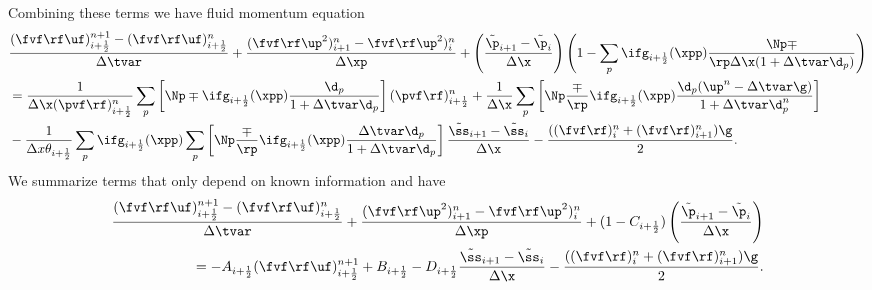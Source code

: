 \color{black}
Combining these terms we have fluid momentum equation
\begin{equation}
\begin{aligned}
\label{eq:momentumEquationFluidDisc}
    &\dfrac{(\fvf \rf \uf)_{i+\frac{1}{2}}^{n+1}- (\fvf \rf \uf)_{i+\frac{1}{2}}^{n}}{\Delta \tvar} + \dfrac{(\fvf \rf \up^2)^n_{i+1}-\fvf \rf \up^2)^n_{i}}{\Delta \xp}
    +  \left( \dfrac{\tilde{\p}_{i+1} - \tilde{\p}_i}{\Delta \x} \right) 
    \left( 1 - \sum_p \ifg_{i+\frac{1}{2}} (\xpp) \dfrac{\Np \mp}{\rp \Delta \x (1 + \Delta \tvar \d_p)} \right) \\
    &=
    \dfrac{1}{\Delta \x (\pvf \rf)_{i+\frac{1}{2}}^n} \sum_p \left[ \Np \mp \ifg_{i+\frac{1}{2}} (\xpp) \frac{\d_p}{1+ \Delta \tvar \d_p}\right] (\pvf \rf)_{i+\frac{1}{2}}^n
    + \dfrac{1}{\Delta \x} \sum_p \left[ \Np \dfrac{\mp}{\rp} \ifg_{i+\frac{1}{2}} (\xpp) \dfrac{\d_p (\up^n - \Delta \tvar \g)}{1 + \Delta \tvar \d_p^n}\right] \\
    &- \dfrac{1}{\Delta x \theta_{i+\frac{1}{2}}} \sum_{p} \ifg_{i+\frac{1}{2}} (\xpp) \sum_p \left[ \Np \dfrac{\mp}{\rp} \ifg_{i+\frac{1}{2}} (\xpp) \dfrac{\Delta \tvar \d_p}{1 + \Delta \tvar \d_p}  \right] \dfrac{\tilde{\ss}_{i+1} - \tilde{\ss}_{i}}{\Delta \x}    
    -\dfrac{((\fvf \rf)_i^n + (\fvf \rf)_{i+1}^n)\g}{2}.
\end{aligned}
\end{equation}
We summarize terms that only depend on known information and have
\begin{align*}
    \dfrac{(\fvf \rf \uf)_{i+\frac{1}{2}}^{n+1}- (\fvf \rf \uf)_{i+\frac{1}{2}}^{n}}{\Delta \tvar} + \dfrac{(\fvf \rf \up^2)^n_{i+1}-\fvf \rf \up^2)^n_{i}}{\Delta \xp}
    +  (1-C_{i+\frac{1}{2}}) \left( \dfrac{\tilde{\p}_{i+1} - \tilde{\p}_i}{\Delta \x} \right) \\ 
    = - A_{i+\frac{1}{2}} (\fvf \rf \uf)_{i+\frac{1}{2}}^{n+1}
    + B_{i+\frac{1}{2}} - D_{i+\frac{1}{2}} \dfrac{\tilde{\ss}_{i+1} - \tilde{\ss}_{i}}{\Delta \x}    
    -\dfrac{((\fvf \rf)_i^n + (\fvf \rf)_{i+1}^n)\g}{2}.
\end{align*}



